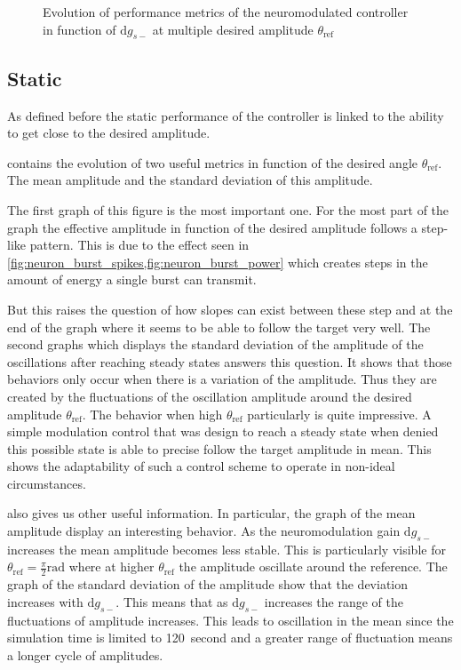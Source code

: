 \begin{figure}[!htbp]
    \centering
    \caption{Evolution of performance metrics of the neuromodulated controller in function of $\mathrm{d}g_{s-}$ at multiple desired amplitude $\theta_\text{ref}$}
    \label{fig:neuromod_gain}
\end{figure}

\subsection{Static}

As defined before the static performance of the controller is linked to the ability to get close to the desired amplitude.

 contains the evolution of two useful metrics in function  of the desired angle $\theta_\text{ref}$. The mean amplitude and the standard deviation of this amplitude.

The first graph of this figure is the most important one. 
For the most part of the graph the effective amplitude in function of the desired amplitude follows a step-like pattern. This is due to the effect seen in \cref{fig:neuron_burst_spikes,fig:neuron_burst_power} which creates steps in the amount of energy a single burst can transmit.

But this raises the question of how slopes can exist between these step and at the end of the graph where it seems to be able to follow the target very well.
The second graphs which displays the standard deviation of the amplitude of the oscillations after reaching steady states answers this question.
It shows that those behaviors only occur when there is a variation of the amplitude.
Thus they are created by the fluctuations of the oscillation amplitude around the desired amplitude $\theta_\text{ref}$.
The behavior when high $\theta_\text{ref}$ particularly is quite impressive.
A simple modulation control that was design to reach a steady state when denied this possible state is able to precise follow the target amplitude in mean.
This shows the adaptability of such a control scheme to operate in non-ideal circumstances.

 also gives us other useful information. 
In particular, the graph of the mean amplitude display an interesting behavior. 
As the neuromodulation gain $\mathrm{d}g_{s-}$ increases the mean amplitude becomes less stable. 
This is particularly visible for $\theta_\text{ref}=\frac{\pi}{2}\unit{\radian}$ where at higher $\theta_\text{ref}$ the amplitude oscillate around the reference.
The graph of the standard deviation of the amplitude show that the deviation increases with $\mathrm{d}g_{s-}$.
This means that as $\mathrm{d}g_{s-}$ increases the range of the fluctuations of amplitude increases.
This leads to oscillation in the mean since the simulation time is limited to \qty{120}{second} and a greater range of fluctuation means a longer cycle of amplitudes.


